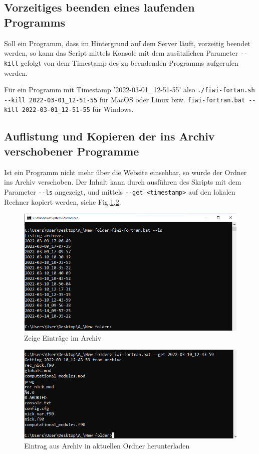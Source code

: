 \documentclass[11pt, a4paper]{article}
\begin{document}
\subsection{Vorzeitiges beenden eines laufenden Programms}

Soll ein Programm, dass im Hintergrund auf dem Server läuft, vorzeitig beendet werden, so kann das Script mittels Konsole mit dem zusätzlichen Parameter \texttt{-{}-kill} gefolgt von dem Timestamp des zu beendenden Programms aufgerufen werden.

Für ein Programm mit Timestamp '2022-03-01\_12-51-55' also
\newline\texttt{./fiwi-fortan.sh -{}-kill 2022-03-01\_12-51-55} für MacOS oder Linux bzw.
\newline\texttt{fiwi-fortran.bat -{}-kill 2022-03-01\_12-51-55} für Windows.

\subsection{Auflistung und Kopieren der ins Archiv verschobener Programme}
Ist ein Programm nicht mehr über die Website einsehbar, so wurde der Ordner ins Archiv verschoben.
Der Inhalt kann durch ausführen des Skripts mit dem Parameter \newline\texttt{-{}-ls} angezeigt, und mittels \newline\texttt{-{}-get <timestamp>} auf den lokalen Rechner kopiert werden, siehe Fig.\ref{fig:script-ls},\ref{fig:script-get}.

\begin{figure}[h]
    \centering
    \includegraphics[width=0.7\linewidth]{./pics/2022-03-16_16-31.png}
    \caption{Zeige Einträge im Archiv}
    \label{fig:script-ls}
\end{figure}
\begin{figure}[h]
    \centering
    \includegraphics[width=0.7\linewidth]{./pics/2022-03-16_16-33_1.png}
    \caption{Eintrag aus Archiv in aktuellen Ordner herunterladen}
    \label{fig:script-get}
\end{figure}
\end{document}
